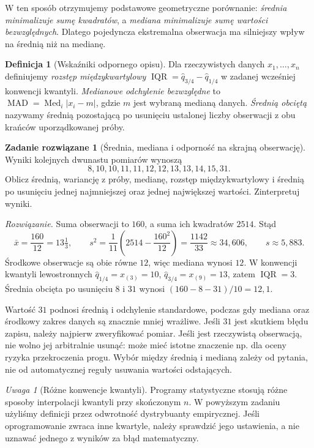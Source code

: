 \documentclass[11pt,a4paper,oneside]{report}
\numberwithin{equation}{chapter}
\theoremstyle{plain}
\theoremstyle{definition}
\newtheorem{definicja}{Definicja}[chapter]
\newtheorem{zadanie}{Zadanie rozwiązane}[chapter]
\theoremstyle{remark}
\newtheorem{uwaga}{Uwaga}[chapter]
\newcommand{\abs}[1]{\lvert#1\rvert}
\DeclareMathOperator{\Med}{Med}
\begin{document}
W ten sposób otrzymujemy podstawowe geometryczne porównanie: \emph{średnia minimalizuje sumę kwadratów}, a \emph{mediana minimalizuje sumę wartości bezwzględnych}. Dlatego pojedyncza ekstremalna obserwacja ma silniejszy wpływ na średnią niż na medianę.

\begin{definicja}[Wskaźniki odpornego opisu]
Dla rzeczywistych danych $x_1,\ldots,x_n$ definiujemy \emph{rozstęp międzykwartylowy} $\operatorname{IQR}=\widehat q_{3/4}-\widehat q_{1/4}$ w zadanej wcześniej konwencji kwantyli. \emph{Medianowe odchylenie bezwzględne} to $\operatorname{MAD}=\Med_i\abs{x_i-m}$, gdzie $m$ jest wybraną medianą danych. \emph{Średnią obciętą} nazywamy średnią pozostającą po usunięciu ustalonej liczby obserwacji z obu krańców uporządkowanej próby.
\end{definicja}

\begin{zadanie}[Średnia, mediana i odporność na skrajną obserwację]\label{zad:outlier}
Wyniki kolejnych dwunastu pomiarów wynoszą
\[
8,10,10,11,11,12,12,13,13,14,15,31.
\]
Oblicz średnią, wariancję z próby, medianę, rozstęp międzykwartylowy i średnią po usunięciu jednej najmniejszej oraz jednej największej wartości. Zinterpretuj wyniki.
\par\emph{Rozwiązanie.} Suma obserwacji to $160$, a suma ich kwadratów $2514$. Stąd
\[
\bar x=\frac{160}{12}=13\tfrac13,\qquad
s^2=\frac1{11}\left(2514-\frac{160^2}{12}\right)=\frac{1142}{33}\approx34{,}606,
\qquad s\approx5{,}883.
\]
Środkowe obserwacje są obie równe $12$, więc mediana wynosi $12$. W konwencji kwantyli lewostronnych $\widehat q_{1/4}=x_{(3)}=10$, $\widehat q_{3/4}=x_{(9)}=13$, zatem $\operatorname{IQR}=3$. Średnia obcięta po usunięciu $8$ i $31$ wynosi $(160-8-31)/10=12{,}1$.

Wartość $31$ podnosi średnią i odchylenie standardowe, podczas gdy mediana oraz środkowy zakres danych są znacznie mniej wrażliwe. Jeśli $31$ jest skutkiem błędu zapisu, należy najpierw zweryfikować pomiar. Jeśli jest rzeczywistą obserwacją, nie wolno jej arbitralnie usunąć: może mieć istotne znaczenie np. dla oceny ryzyka przekroczenia progu. Wybór między średnią i medianą zależy od pytania, nie od automatycznej reguły usuwania wartości odstających.
\end{zadanie}

\begin{uwaga}[Różne konwencje kwantyli]
Programy statystyczne stosują różne sposoby interpolacji kwantyli przy skończonym $n$. W powyższym zadaniu użyliśmy definicji przez odwrotność dystrybuanty empirycznej. Jeśli oprogramowanie zwraca inne kwartyle, należy sprawdzić jego ustawienia, a nie uznawać jednego z wyników za błąd matematyczny.
\end{uwaga}
\end{document}
